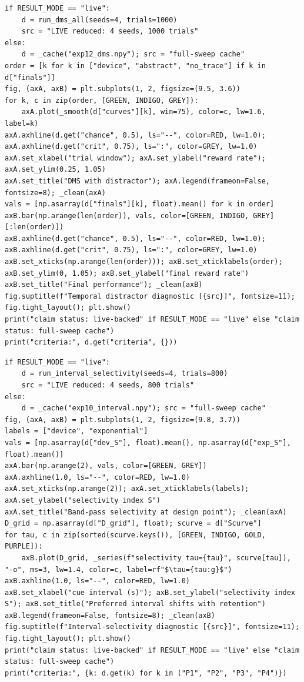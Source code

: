 \begin{lstlisting}[caption={04\_temporal\_selectivity.ipynb code cell 2},label={lst:mrl-nb-04-temporal-selectivity-2}]
if RESULT_MODE == "live":
    d = run_dms_all(seeds=4, trials=1000)
    src = "LIVE reduced: 4 seeds, 1000 trials"
else:
    d = _cache("exp12_dms.npy"); src = "full-sweep cache"
order = [k for k in ["device", "abstract", "no_trace"] if k in d["finals"]]
fig, (axA, axB) = plt.subplots(1, 2, figsize=(9.5, 3.6))
for k, c in zip(order, [GREEN, INDIGO, GREY]):
    axA.plot(_smooth(d["curves"][k], win=75), color=c, lw=1.6, label=k)
axA.axhline(d.get("chance", 0.5), ls="--", color=RED, lw=1.0); axA.axhline(d.get("crit", 0.75), ls=":", color=GREY, lw=1.0)
axA.set_xlabel("trial window"); axA.set_ylabel("reward rate"); axA.set_ylim(0.25, 1.05)
axA.set_title("DMS with distractor"); axA.legend(frameon=False, fontsize=8); _clean(axA)
vals = [np.asarray(d["finals"][k], float).mean() for k in order]
axB.bar(np.arange(len(order)), vals, color=[GREEN, INDIGO, GREY][:len(order)])
axB.axhline(d.get("chance", 0.5), ls="--", color=RED, lw=1.0); axB.axhline(d.get("crit", 0.75), ls=":", color=GREY, lw=1.0)
axB.set_xticks(np.arange(len(order))); axB.set_xticklabels(order); axB.set_ylim(0, 1.05); axB.set_ylabel("final reward rate")
axB.set_title("Final performance"); _clean(axB)
fig.suptitle(f"Temporal distractor diagnostic [{src}]", fontsize=11); fig.tight_layout(); plt.show()
print("claim status: live-backed" if RESULT_MODE == "live" else "claim status: full-sweep cache")
print("criteria:", d.get("criteria", {}))
\end{lstlisting}

\begin{lstlisting}[caption={04\_temporal\_selectivity.ipynb code cell 3},label={lst:mrl-nb-04-temporal-selectivity-3}]
if RESULT_MODE == "live":
    d = run_interval_selectivity(seeds=4, trials=800)
    src = "LIVE reduced: 4 seeds, 800 trials"
else:
    d = _cache("exp10_interval.npy"); src = "full-sweep cache"
fig, (axA, axB) = plt.subplots(1, 2, figsize=(9.8, 3.7))
labels = ["device", "exponential"]
vals = [np.asarray(d["dev_S"], float).mean(), np.asarray(d["exp_S"], float).mean()]
axA.bar(np.arange(2), vals, color=[GREEN, GREY])
axA.axhline(1.0, ls="--", color=RED, lw=1.0)
axA.set_xticks(np.arange(2)); axA.set_xticklabels(labels); axA.set_ylabel("selectivity index S")
axA.set_title("Band-pass selectivity at design point"); _clean(axA)
D_grid = np.asarray(d["D_grid"], float); scurve = d["Scurve"]
for tau, c in zip(sorted(scurve.keys()), [GREEN, INDIGO, GOLD, PURPLE]):
    axB.plot(D_grid, _series(f"selectivity tau={tau}", scurve[tau]), "-o", ms=3, lw=1.4, color=c, label=rf"$\tau={tau:g}$")
axB.axhline(1.0, ls="--", color=RED, lw=1.0)
axB.set_xlabel("cue interval (s)"); axB.set_ylabel("selectivity index S"); axB.set_title("Preferred interval shifts with retention")
axB.legend(frameon=False, fontsize=8); _clean(axB)
fig.suptitle(f"Interval-selectivity diagnostic [{src}]", fontsize=11); fig.tight_layout(); plt.show()
print("claim status: live-backed" if RESULT_MODE == "live" else "claim status: full-sweep cache")
print("criteria:", {k: d.get(k) for k in ("P1", "P2", "P3", "P4")})
\end{lstlisting}

